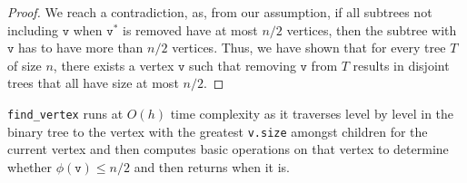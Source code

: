 \documentclass[11pt]{scrartcl}
\theoremstyle{dotlessP}
\theoremstyle{dotlessN}
\newcommand{\contradiction}{{\hbox{%
    \setbox0=\hbox{$\mkern-3mu\times\mkern-3mu$}%
    \setbox1=\hbox to0pt{\hss$\times$\hss}%
    \copy0\raisebox{0.5\wd0}{\copy1}\raisebox{-0.5\wd0}{\box1}\box0
}}}
\begin{document}
\begin{ans}
\begin{proof}
		We reach a contradiction, as, from our assumption, if all subtrees not including $\texttt{v}$ when $\texttt{v}^*$ is removed have at most $n/2$ vertices, then the subtree with $\texttt{v}$ has to have more than $n/2$ vertices. Thus, we have shown that for every tree $T$ of size $n$, there exists a vertex $\texttt{v}$ such that removing $\texttt{v}$ from $T$ results in disjoint trees that all have size at most $n/2$.
%
%
%
%
%
	\end{proof}
\end{ans}
\begin{ans}
	\texttt{find\_vertex} runs at $O(h)$ time complexity as it traverses level by level in the binary tree to the vertex with the greatest \texttt{v.size} amongst children for the current vertex and then computes basic operations on that vertex to determine whether $\phi(\texttt{v}) \leq n/2$ and then returns when it is.
\end{ans}
\end{document}
